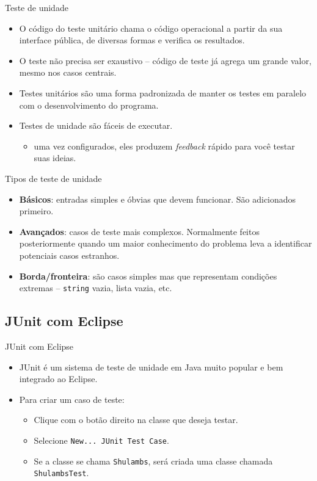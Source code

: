 \documentclass[handout]{beamer}
\begin{document}
\begin{frame}{Teste de unidade}

\begin{itemize}
\item O código do teste unitário chama o código operacional a partir da sua interface pública, de diversas formas e verifica os resultados.
\item O teste não precisa ser exaustivo -- código de teste já agrega um grande valor, mesmo nos casos centrais.
\item Testes unitários são uma forma padronizada de manter os testes em paralelo com o desenvolvimento do programa.
\item Testes de unidade são fáceis de executar.
\begin{itemize}
\item uma vez configurados, eles produzem \textit{feedback} rápido para você testar suas ideias.
\end{itemize}
\end{itemize}
\end{frame}

\begin{frame}{Tipos de teste de unidade}
\begin{itemize}
\item \textbf{Básicos}: entradas simples e óbvias que devem funcionar. São adicionados primeiro.

\item \textbf{Avançados}: casos de teste mais complexos. Normalmente feitos posteriormente quando um maior conhecimento do problema leva a identificar potenciais casos estranhos.

\item \textbf{Borda/fronteira}: são casos simples mas que representam condições extremas -- \lstinline|string| vazia, lista vazia, etc.

\end{itemize}

\end{frame}

\subsection{JUnit com Eclipse}

\begin{frame}{JUnit com Eclipse}
\begin{itemize}
\item JUnit é um sistema de teste de unidade em Java muito popular e bem integrado ao Eclipse.
\item Para criar um caso de teste:
\begin{itemize}
\item Clique com o botão direito na classe que deseja testar.
\item Selecione \texttt{New... JUnit Test Case}.
\item Se a classe se chama \lstinline|Shulambs|, será criada uma classe chamada \lstinline|ShulambsTest|.
\end{itemize}
\end{itemize}

\end{frame}
\end{document}

